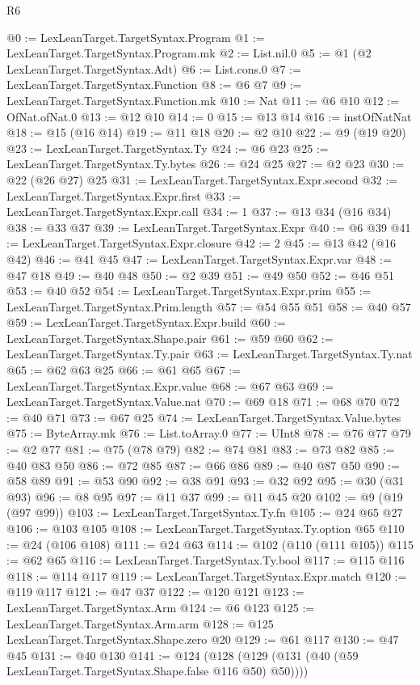 \begin{lexlean}{R6}
\begin{coremodule}
@0 := LexLeanTarget.TargetSyntax.Program
@1 := LexLeanTarget.TargetSyntax.Program.mk
@2 := List.nil.{0}
@5 := @1 (@2 LexLeanTarget.TargetSyntax.Adt)
@6 := List.cons.{0}
@7 := LexLeanTarget.TargetSyntax.Function
@8 := @6 @7
@9 := LexLeanTarget.TargetSyntax.Function.mk
@10 := Nat
@11 := @6 @10
@12 := OfNat.ofNat.{0}
@13 := @12 @10
@14 := 0
@15 := @13 @14
@16 := instOfNatNat
@18 := @15 (@16 @14)
@19 := @11 @18
@20 := @2 @10
@22 := @9 (@19 @20)
@23 := LexLeanTarget.TargetSyntax.Ty
@24 := @6 @23
@25 := LexLeanTarget.TargetSyntax.Ty.bytes
@26 := @24 @25
@27 := @2 @23
@30 := @22 (@26 @27) @25
@31 := LexLeanTarget.TargetSyntax.Expr.second
@32 := LexLeanTarget.TargetSyntax.Expr.first
@33 := LexLeanTarget.TargetSyntax.Expr.call
@34 := 1
@37 := @13 @34 (@16 @34)
@38 := @33 @37
@39 := LexLeanTarget.TargetSyntax.Expr
@40 := @6 @39
@41 := LexLeanTarget.TargetSyntax.Expr.closure
@42 := 2
@45 := @13 @42 (@16 @42)
@46 := @41 @45
@47 := LexLeanTarget.TargetSyntax.Expr.var
@48 := @47 @18
@49 := @40 @48
@50 := @2 @39
@51 := @49 @50
@52 := @46 @51
@53 := @40 @52
@54 := LexLeanTarget.TargetSyntax.Expr.prim
@55 := LexLeanTarget.TargetSyntax.Prim.length
@57 := @54 @55 @51
@58 := @40 @57
@59 := LexLeanTarget.TargetSyntax.Expr.build
@60 := LexLeanTarget.TargetSyntax.Shape.pair
@61 := @59 @60
@62 := LexLeanTarget.TargetSyntax.Ty.pair
@63 := LexLeanTarget.TargetSyntax.Ty.nat
@65 := @62 @63 @25
@66 := @61 @65
@67 := LexLeanTarget.TargetSyntax.Expr.value
@68 := @67 @63
@69 := LexLeanTarget.TargetSyntax.Value.nat
@70 := @69 @18
@71 := @68 @70
@72 := @40 @71
@73 := @67 @25
@74 := LexLeanTarget.TargetSyntax.Value.bytes
@75 := ByteArray.mk
@76 := List.toArray.{0}
@77 := UInt8
@78 := @76 @77
@79 := @2 @77
@81 := @75 (@78 @79)
@82 := @74 @81
@83 := @73 @82
@85 := @40 @83 @50
@86 := @72 @85
@87 := @66 @86
@89 := @40 @87 @50
@90 := @58 @89
@91 := @53 @90
@92 := @38 @91
@93 := @32 @92
@95 := @30 (@31 @93)
@96 := @8 @95
@97 := @11 @37
@99 := @11 @45 @20
@102 := @9 (@19 (@97 @99))
@103 := LexLeanTarget.TargetSyntax.Ty.fn
@105 := @24 @65 @27
@106 := @103 @105
@108 := LexLeanTarget.TargetSyntax.Ty.option @65
@110 := @24 (@106 @108)
@111 := @24 @63
@114 := @102 (@110 (@111 @105))
@115 := @62 @65
@116 := LexLeanTarget.TargetSyntax.Ty.bool
@117 := @115 @116
@118 := @114 @117
@119 := LexLeanTarget.TargetSyntax.Expr.match
@120 := @119 @117
@121 := @47 @37
@122 := @120 @121
@123 := LexLeanTarget.TargetSyntax.Arm
@124 := @6 @123
@125 := LexLeanTarget.TargetSyntax.Arm.arm
@128 := @125 LexLeanTarget.TargetSyntax.Shape.zero @20
@129 := @61 @117
@130 := @47 @45
@131 := @40 @130
@141 := @124 (@128 (@129 (@131 (@40 (@59 LexLeanTarget.TargetSyntax.Shape.false @116 @50) @50))))

\end{coremodule}
\end{lexlean}
